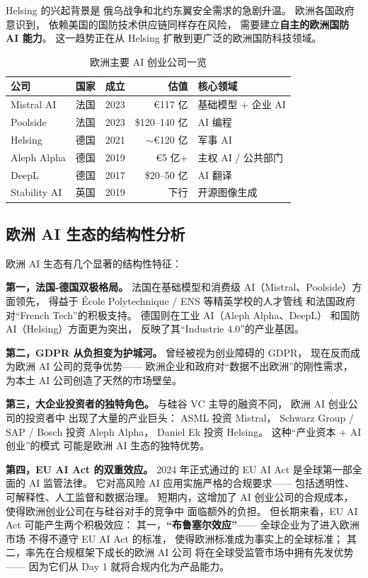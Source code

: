 Helsing 的兴起背景是
俄乌战争和北约东翼安全需求的急剧升温。
欧洲各国政府意识到，
依赖美国的国防技术供应链同样存在风险，
需要建立\textbf{自主的欧洲国防 AI 能力}。
这一趋势正在从 Helsing 扩散到更广泛的欧洲国防科技领域。

\begin{table}[htbp]
\centering
\caption{欧洲主要 AI 创业公司一览}
\label{tab:europe-ai}
\small
\begin{tabularx}{\textwidth}{l l l r X}
\toprule
\rowcolor{figLightGray}
\textbf{公司} & \textbf{国家} & \textbf{成立} & \textbf{估值} & \textbf{核心领域} \\
\midrule
Mistral AI    & 法国 & 2023 & €117 亿 & 基础模型 + 企业 AI \\
Poolside      & 法国 & 2023 & \$120--140 亿 & AI 编程 \\
Helsing       & 德国 & 2021 & $\sim$€120 亿 & 军事 AI \\
Aleph Alpha   & 德国 & 2019 & €5 亿+   & 主权 AI / 公共部门 \\
DeepL         & 德国 & 2017 & \$20--50 亿 & AI 翻译 \\
Stability AI  & 英国 & 2019 & 下行      & 开源图像生成 \\
\bottomrule
\end{tabularx}
\end{table}

\subsection{欧洲 AI 生态的结构性分析}

欧洲 AI 生态有几个显著的结构性特征：

\textbf{第一，法国-德国双极格局。}
法国在基础模型和消费级 AI（Mistral、Poolside）方面领先，
得益于 École Polytechnique / ENS 等精英学校的人才管线
和法国政府对``French Tech''的积极支持。
德国则在工业 AI（Aleph Alpha、DeepL）
和国防 AI（Helsing）方面更为突出，
反映了其``Industrie 4.0''的产业基因。

\textbf{第二，GDPR 从负担变为护城河。}
曾经被视为创业障碍的 GDPR，
现在反而成为欧洲 AI 公司的竞争优势——
欧洲企业和政府对``数据不出欧洲''的刚性需求，
为本土 AI 公司创造了天然的市场壁垒。

\textbf{第三，大企业投资者的独特角色。}
与硅谷 VC 主导的融资不同，
欧洲 AI 创业公司的投资者中
出现了大量的产业巨头：
ASML 投资 Mistral，
Schwarz Group / SAP / Bosch 投资 Aleph Alpha，
Daniel Ek 投资 Helsing。
这种``产业资本 + AI 创业''的模式
可能是欧洲 AI 生态的独特优势。

\textbf{第四，EU AI Act 的双重效应。}
2024 年正式通过的 EU AI Act
是全球第一部全面的 AI 监管法律。
它对高风险 AI 应用实施严格的合规要求——
包括透明性、可解释性、人工监督和数据治理。
短期内，这增加了 AI 创业公司的合规成本，
使得欧洲创业公司在与硅谷对手的竞争中
面临额外的负担。
但长期来看，EU AI Act 可能产生两个积极效应：
其一，\textbf{``布鲁塞尔效应''}——
全球企业为了进入欧洲市场
不得不遵守 EU AI Act 的标准，
使得欧洲标准成为事实上的全球标准；
其二，率先在合规框架下成长的欧洲 AI 公司
将在全球受监管市场中拥有先发优势——
因为它们从 Day 1 就将合规内化为产品能力。

